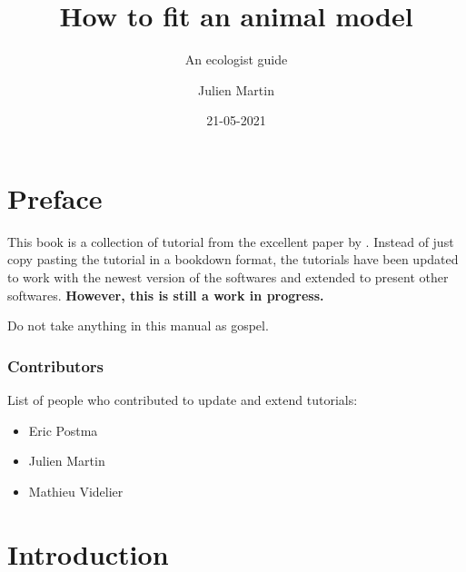 \documentclass[
  12pt,
]{book}
\title{How to fit an animal model}
\subtitle{An ecologist guide}
\author{Julien Martin}
\date{21-05-2021}
\makeatletter
\providecommand{\tightlist}{%
  \setlength{\itemsep}{0pt}\setlength{\parskip}{0pt}}
\newenvironment{kframe}{%
\medskip{}
\setlength{\fboxsep}{.8em}
\def\at@end@of@kframe{}%
\ifinner\ifhmode%
 \def\at@end@of@kframe{\end{minipage}}%
 \begin{minipage}{\columnwidth}%
\fi\fi%
\def\FrameCommand##1{\hskip\@totalleftmargin \hskip-\fboxsep
\colorbox{incolor}{##1}\hskip-\fboxsep
    \hskip-\linewidth \hskip-\@totalleftmargin \hskip\columnwidth}%
\MakeFramed {\advance\hsize-\width
  \@totalleftmargin\z@ \linewidth\hsize
  \@setminipage}}%
{\par\unskip\endMakeFramed%
\at@end@of@kframe}
\newenvironment{rmdblock}[1]
 {
 \begin{itemize}
 \renewcommand{\labelitemi}{
   \raisebox{-.7\height}[0pt][0pt]{
     {\setkeys{Gin}{width=3em,keepaspectratio}\texttt{[image: images/\#1]}}
   }
 }
 \begin{kframe}
 \setlength{\fboxsep}{1em}
 \item
 }
 {
 \end{kframe}
 \end{itemize}
 }
\newenvironment{rmdwarning}
  {\begin{rmdblock}{warning}}
  {\end{rmdblock}}
\makeatother
\begin{document}
\maketitle



{
\setcounter{tocdepth}{1}
\tableofcontents
}
\hypertarget{preface}{%
\chapter*{Preface}\label{preface}}

This book is a collection of tutorial from the excellent paper by \citep{wilson2010}.
Instead of just copy pasting the tutorial in a bookdown format, the tutorials have been updated to work with the newest version of the softwares and extended to present other softwares.
\textbf{However, this is still a work in progress.}

\begin{rmdwarning}
Do not take anything in this manual as gospel.
\end{rmdwarning}

\hypertarget{contributors}{%
\subsection*{Contributors}\label{contributors}}

List of people who contributed to update and extend tutorials:

\begin{itemize}
\tightlist
\item
  Eric Postma
\item
  Julien Martin
\item
  Mathieu Videlier
\end{itemize}

\hypertarget{intro}{%
\chapter{Introduction}\label{intro}}
\end{document}
